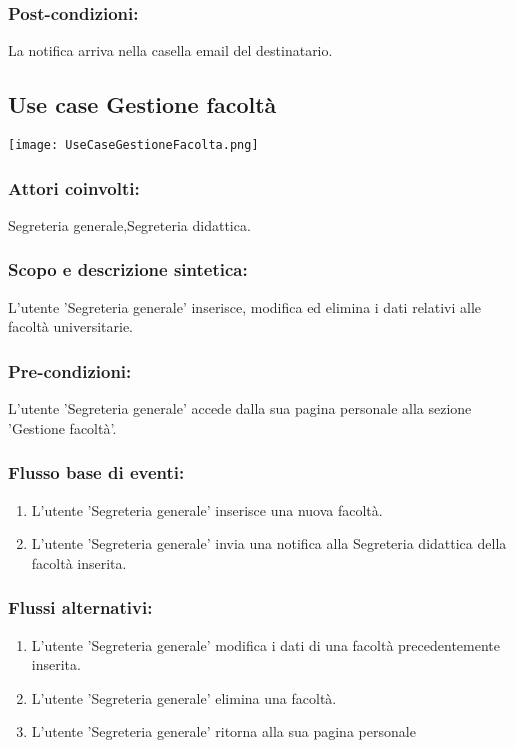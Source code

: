 \documentclass[11pt,a4paper]{article}
\begin{document}
\subsubsection*{Post-condizioni:}
La notifica arriva nella casella email del destinatario.

\subsection{Use case Gestione facoltà}
\begin{center} 
 \texttt{[image: UseCaseGestioneFacolta.png]}
\end{center}
\subsubsection*{Attori coinvolti:}
Segreteria generale,Segreteria didattica.
\subsubsection*{Scopo e descrizione sintetica:}
L'utente 'Segreteria generale' inserisce, modifica ed elimina i dati relativi alle facoltà universitarie.
\subsubsection*{Pre-condizioni:}
L'utente 'Segreteria generale' accede dalla sua pagina personale alla sezione 'Gestione facoltà'.
\subsubsection*{Flusso base di eventi:}
\begin{enumerate}
 \item L'utente 'Segreteria generale' inserisce una nuova facoltà.
 \item L'utente 'Segreteria generale' invia una notifica alla Segreteria didattica della facoltà inserita.
\end{enumerate}
\subsubsection*{Flussi alternativi:}
\begin{enumerate}
 \item L'utente 'Segreteria generale' modifica i dati di una facoltà precedentemente inserita.
 \item L'utente 'Segreteria generale' elimina una facoltà.
 \item L'utente 'Segreteria generale' ritorna alla sua pagina personale
\end{enumerate}
\end{document}
